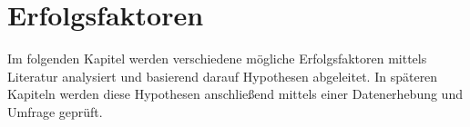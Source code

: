 \chapter{Erfolgsfaktoren}



Im folgenden Kapitel werden verschiedene mögliche Erfolgsfaktoren mittels Literatur analysiert und
basierend darauf Hypothesen abgeleitet. In späteren Kapiteln werden diese Hypothesen anschließend
mittels einer Datenerhebung und Umfrage geprüft.





\newpage


\newpage


\newpage


\newpage









% 

